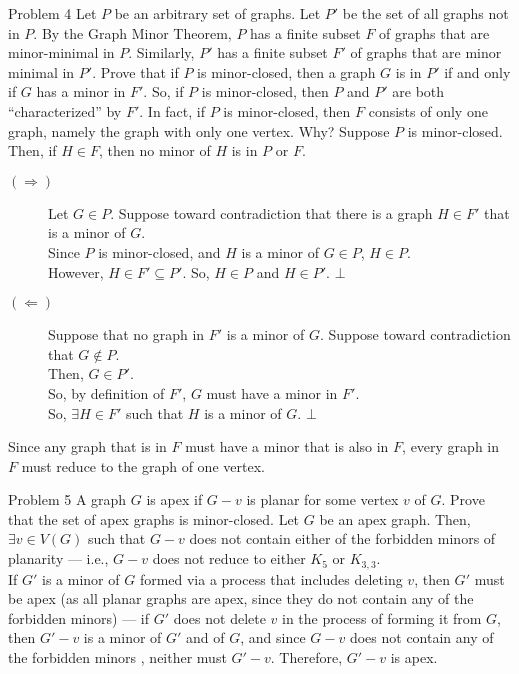 \documentclass[8pt]{extarticle}
\begin{document}
  \begin{problem}{Problem 4}
    Let $P$ be an arbitrary set of graphs. Let $P'$ be the set of all graphs not in $P$. By the Graph Minor Theorem, $P$ has a finite subset $F$ of graphs that are minor-minimal in $P$. Similarly, $P'$ has a finite subset $F'$ of graphs that are minor minimal in $P'$. Prove that if $P$ is minor-closed, then a graph $G$ is in $P'$ if and only if $G$ has a minor in $F'$. So, if $P$ is minor-closed, then $P$ and $P'$ are both ``characterized'' by $F'$. In fact, if $P$ is minor-closed, then $F$ consists of only one graph, namely the graph with only one vertex. Why?
    \tcblower
    Suppose $P$ is minor-closed. Then, if $H\in F$, then no minor of $H$ is in $P$ or $F$. 
    \begin{description}
      \item[$(\Rightarrow)$] Let $G\in P$. Suppose toward contradiction that there is a graph $H\in F'$ that is a minor of $G$.\\

        Since $P$ is minor-closed, and $H$ is a minor of $G\in P$, $H\in P$.\\

        However, $H\in F'\subseteq P'$. So, $H\in P$ and $H\in P'$. $\bot$
      \item[$(\Leftarrow)$] Suppose that no graph in $F'$ is a minor of $G$. Suppose toward contradiction that $G \notin P$.\\

        Then, $G\in P'$.\\

        So, by definition of $F'$, $G$ must have a minor in $F'$.\\

        So, $\exists H\in F'$ such that $H$ is a minor of $G$. $\bot$
    \end{description}
    Since any graph that is in $F$ must have a minor that is also in $F$, every graph in $F$ must reduce to the graph of one vertex.
  \end{problem}
  \begin{problem}{Problem 5}
    A graph $G$ is apex if $G-v$ is planar for some vertex $v$ of $G$. Prove that the set of apex graphs is minor-closed.
    \tcblower
    Let $G$ be an apex graph. Then, $\exists v\in V(G)$ such that $G-v$ does not contain either of the forbidden minors of planarity --- i.e., $G-v$ does not reduce to either $K_5$ or $K_{3,3}$.\\

    If $G'$ is a minor of $G$ formed via a process that includes deleting $v$, then $G'$ must be apex (as all planar graphs are apex, since they do not contain any of the forbidden minors) --- if $G'$ does not delete $v$ in the process of forming it from $G$, then $G' - v$ is a minor of $G'$ and of $G$, and since $G - v$ does not contain any of the forbidden minors , neither must $G' - v$. Therefore, $G' - v$ is apex.
    \end{problem}
\end{document}
